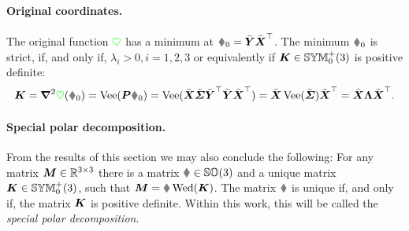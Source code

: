 \paragraph{Original coordinates.}
The original function $\textcolor{green}{\heartsuit}$ has a minimum at $\R_0 = \bar{\mat{Y}} \bar{\mat{X}}^\top$.
The minimum $\R_0$ is strict, if, and only if, $\lambda_i > 0, i=1,2,3$ or equivalently if $\boldsymbol{K} \in \mathbb{SYM}^{+}_{0}(3)$ is positive definite:
\begin{align}
 \mat{K} = \differential^2 \potentialEnergy (\R_0) 
 = \veeMatOp(\mat{P}\R_0) 
 = \veeMatOp(\bar{\mat{X}} \bar{\mat{\varSigma}} \bar{\mat{Y}}^\top \bar{\mat{Y}} \bar{\mat{X}}^\top)
 = \bar{\mat{X}} \veeMatOp(\bar{\mat{\varSigma}}) \bar{\mat{X}}^\top
 = \bar{\mat{X}} \mat{\Lambda} \bar{\mat{X}}^\top.
\end{align}

\paragraph{Special polar decomposition.}
From the results of this section we may also conclude the following:
For any matrix $\boldsymbol{M} \in\mathbb{R}^{3\times3}$ there is a matrix $\R \in \SpecialOrthogonalGroup(3)$ and a unique matrix $\boldsymbol{K} \in \mathbb{SYM}^{+}_{0}(3)$, such that $\mat{M} = \R \wedMatOp(\mat{K})$.
The matrix $\R$ is unique if, and only if, the matrix $\boldsymbol{K}$ is positive definite.
Within this work, this will be called the \textit{special polar decomposition}.




